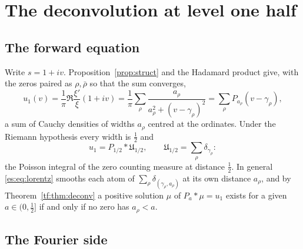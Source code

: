 \section{The deconvolution at level one half}\label{es:sec:level}

\subsection{The forward equation}

Write $s=1+iv$. Proposition~\ref{prop:struct} and the Hadamard product give, with the zeros paired as $\rho,\bar\rho$ so that the sum converges,
\begin{equation}\label{es:eq:lorentz}
u_1(v)=\frac1\pi\Re\frac{\xi'}\xi(1+iv)=\frac1\pi\sum_\rho\frac{a_\rho}{a_\rho^2+(v-\gamma_\rho)^2}=\sum_\rho P_{a_\rho}(v-\gamma_\rho),
\end{equation}
a sum of Cauchy densities of widths $a_\rho$ centred at the ordinates. Under the Riemann hypothesis every width is $\tfrac12$ and
\begin{equation}\label{es:eq:forward}
u_1=P_{1/2}*\mathfrak U_{1/2},\qquad\mathfrak U_{1/2}=\sum_\rho\delta_{\gamma_\rho}:
\end{equation}
the Poisson integral of the zero counting measure at distance $\tfrac12$. In general \eqref{es:eq:lorentz} smooths each atom of $\sum_\rho\delta_{(\gamma_\rho,a_\rho)}$ at its own distance $a_\rho$, and by Theorem~\ref{tf:thm:deconv} a positive solution $\mu$ of $P_a*\mu=u_1$ exists for a given $a\in(0,\tfrac12]$ if and only if no zero has $a_\rho<a$.

\subsection{The Fourier side}

